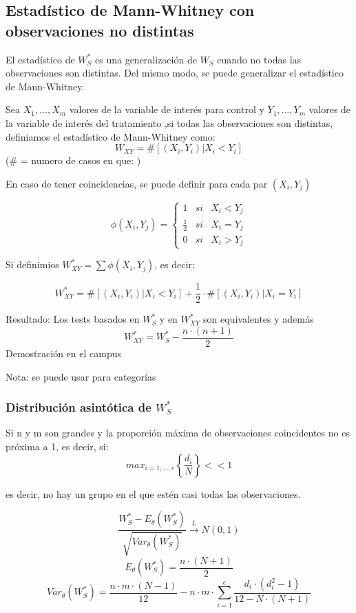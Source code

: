 \subsection{Estadístico de Mann-Whitney con observaciones no distintas}

El estadístico de $W_S^*$ es una generalización de $W_S$ cuando no todas las observaciones son distintas.
Del mismo modo, se puede generalizar el estadístico de Mann-Whitney. 

Sea $X_1,\dots,X_m$ valores de la variable de interés para control y $Y_1,\dots,Y_m$ valores de la variable de interés del tratamiento
,si todas las observaciones son distintas, definiamos el estadístico de Mann-Whitney como:
\[
W_{XY}= \# [(X_i,Y_i)|X_i<Y_i]
\]
($\#$ = numero de casos en que: )

En caso de tener coincidencias, se puede definir para cada par $(X_i,Y_j)$

\[
\phi(X_i,Y_j)=\left\{ 
    \begin{matrix}
        1 & si & X_i<Y_j \\
        \frac{1}{2} & si & X_i=Y_j \\
        0 & si & X_i>Y_j
    \end{matrix}
\right.
\]

Si definimios $W_{XY}^*=\sum \phi (X_i,Y_j)$, es decir:

\[
W_{XY}^* = \# [(X_i,Y_i)|X_i<Y_i] + \frac{1}{2} \cdot \# [(X_i,Y_i)|X_i=Y_i]
\]

Resultado: Los tests basados en $W_S^*$ y en $W_{XY}^*$ son equivalentes y además
\[
W_{XY}^*=W_S^*-\frac{n \cdot (n+1)}{2}
\]
Demostración en el campus

Nota: se puede usar para categorías
\newpage
\subsubsection{Distribución asintótica de $W_S^*$}

Si n y m son grandes y la proporción máxima de observaciones coincidentes no es próxima a 1, es decir, si:
\[
max_{i=1,\dots,e}\left\{\frac{d_i}{N} \right\} << 1
\]

es decir, no hay un grupo en el que estén casi todas las observaciones.

\[
\frac{W_S^*-E_\theta(W_S^*)}{\sqrt{Var_\theta(W_S^*)}} \xrightarrow{L} N(0,1)
\]
\[
E_\theta(W_S^*)=\frac{n \cdot (N+1)}{2}
\]
\[
Var_\theta(W_S^*)= \frac{n \cdot m \cdot (N-1)}{12}-n\cdot m \cdot \sum_{i=1}^{e} \frac{d_i \cdot (d_i^2-1)}{12-N \cdot (N+1)}
\]

